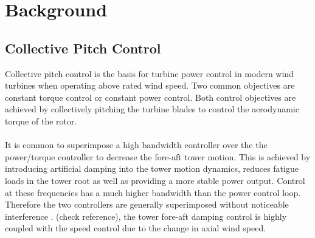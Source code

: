 \section{Background}
\subsection{Collective Pitch Control}
Collective pitch control is the basis for turbine power control in modern wind turbines when operating above rated wind speed. Two common objectives are constant torque control or constant power control. Both control objectives are achieved by collectively pitching the turbine blades to control the aerodynamic torque of the rotor. 
\\~\\
It is common to superimpose a high bandwidth controller over the the power/torque controller to decrease the fore-aft tower motion. This is achieved by introducing artificial damping into the tower motion dynamics, reduces fatigue loads in the tower root as well as providing a more stable power output. Control at these frequencies has a much higher bandwidth than the power control loop. Therefore the two controllers are generally superimposed without noticeable interference \cite{15_bossanyi}. \citet{17_Geyler} (check reference), the tower fore-aft damping control is highly coupled with the speed control due to the change in axial wind speed. 

